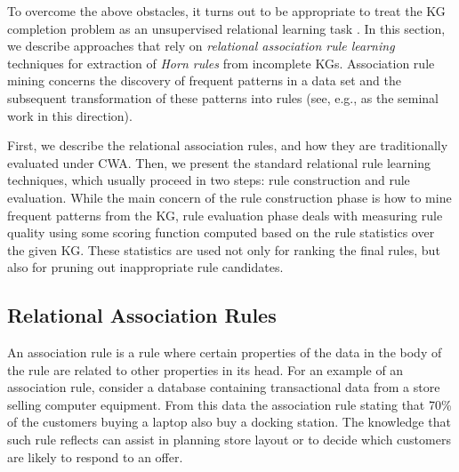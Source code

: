 To overcome the above obstacles, it turns out to be appropriate to treat the KG completion problem as an unsupervised relational learning task \cite{amie}.
In this section, we describe approaches that rely on \emph{relational association rule learning} techniques for extraction of \emph{Horn rules} from incomplete KGs. 
Association rule mining concerns the discovery of frequent patterns in a data set and the subsequent transformation of these patterns into rules
(see, e.g., \cite{DBLP:conf/ilp/DehaspeR97} as the seminal work in this direction). %

First, we describe the relational association rules, and how they are traditionally evaluated under CWA. Then, we present the standard relational rule learning techniques, which usually proceed in two 
steps: rule construction and rule evaluation. While the main concern of the rule construction phase is how to mine frequent patterns from the KG, 
rule evaluation phase deals with measuring rule quality %
using some scoring function computed based on the rule statistics over the given KG. These statistics are used not only for ranking the final rules, but also for pruning out inappropriate rule candidates.




\subsection{Relational Association Rules}
\label{subsec:assoc_rule}
An association rule is a rule where certain properties of the data in the body of
the rule are related to other properties in its head. For an example of an association rule, consider a
database containing transactional data from a store selling computer equipment.
From this data the association rule stating that 70\% of the customers
buying a laptop also buy a docking station. The knowledge that such rule reflects 
can assist in planning store layout or to decide which customers are likely to respond to an
offer.

